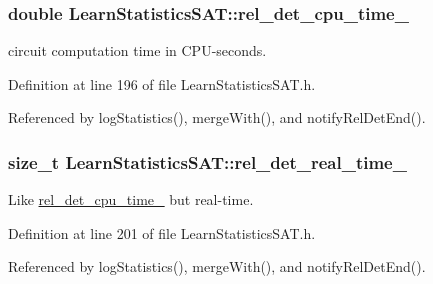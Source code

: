 \hypertarget{classLearnStatisticsSAT_aa7d1ca100b6ad0500931ca80d1439f28}{
\subsubsection[{rel\-\_\-det\-\_\-cpu\-\_\-time\-\_\-}]{\setlength{\rightskip}{0pt plus 5cm}double Learn\-Statistics\-S\-A\-T\-::rel\-\_\-det\-\_\-cpu\-\_\-time\-\_\-\hspace{0.3cm}{\ttfamily [protected]}}}\label{classLearnStatisticsSAT_aa7d1ca100b6ad0500931ca80d1439f28}


circuit computation time in C\-P\-U-\/seconds. 



Definition at line 196 of file Learn\-Statistics\-S\-A\-T.\-h.



Referenced by log\-Statistics(), merge\-With(), and notify\-Rel\-Det\-End().

\hypertarget{classLearnStatisticsSAT_a65bb33d1f5088fc9ed2f947b87e8d4cb}{
\subsubsection[{rel\-\_\-det\-\_\-real\-\_\-time\-\_\-}]{\setlength{\rightskip}{0pt plus 5cm}size\-\_\-t Learn\-Statistics\-S\-A\-T\-::rel\-\_\-det\-\_\-real\-\_\-time\-\_\-\hspace{0.3cm}{\ttfamily [protected]}}}\label{classLearnStatisticsSAT_a65bb33d1f5088fc9ed2f947b87e8d4cb}


Like \hyperlink{classLearnStatisticsSAT_aa7d1ca100b6ad0500931ca80d1439f28}{rel\-\_\-det\-\_\-cpu\-\_\-time\-\_\-} but real-\/time. 



Definition at line 201 of file Learn\-Statistics\-S\-A\-T.\-h.



Referenced by log\-Statistics(), merge\-With(), and notify\-Rel\-Det\-End().

